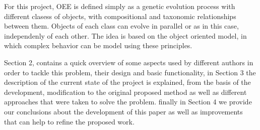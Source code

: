 \documentclass[conference]{IEEEtran}
\begin{document}
For this project, OEE is defined simply as a genetic evolution process with
different clasess of objects, with compositional and taxonomic relationships between them.
Objects of each class can evolve in parallel or as in this case, independenly of each other.   
The idea is based on the object oriented model, in which complex behavior can be model 
using these principles.




Section 2, contains a quick overview of some aspects used by different authors
in order to tackle this problem, their design and basic functionality, in
Section 3 the description of the current state of the project is explained, from
the basis of the development, modification to the original proposed method as 
well as different approaches that were taken to solve the problem.
finally in Section 4 we provide our conclusions about the development of this
paper as well as improvements that can help to refine the proposed work. 

 


%
\end{document}
